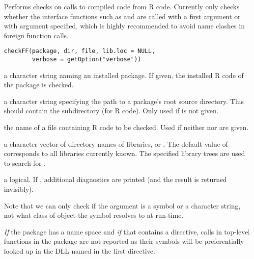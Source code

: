 %
\begin{Description}\relax
Performs checks on calls to compiled code from R code.  Currently only
checks whether the interface functions such as  and
 are called with a 
first argument or with argument  specified, which is
highly recommended to avoid name clashes in foreign function calls.
\end{Description}
%
\begin{Usage}
\begin{verbatim}
checkFF(package, dir, file, lib.loc = NULL,
        verbose = getOption("verbose"))
\end{verbatim}
\end{Usage}
%
\begin{Arguments}
\begin{ldescription}
\item[\code{package}] a character string naming an installed package.  If
given, the installed R code of the package is checked.
\item[\code{dir}] a character string specifying the path to a package's root
source directory.  This should contain the subdirectory 
(for R code).  Only used if  is not given.
\item[\code{file}] the name of a file containing R code to be checked.  Used
if neither  nor  are given.
\item[\code{lib.loc}] a character vector of directory names of \R{} libraries,
or .  The default value of  corresponds to all
libraries currently known.  The specified library trees are used to
search for .
\item[\code{verbose}] a logical.  If , additional diagnostics are
printed (and the result is returned invisibly).
\end{ldescription}
\end{Arguments}
%
\begin{Details}\relax
Note that we can only check if the  argument is a symbol or
a character string, not what class of object the symbol resolves to
at run-time.

\emph{If} the package has a name space and \emph{if} that contains a
 directive, calls in top-level functions in the
package are not reported as their symbols will be preferentially
looked up in the DLL named in the first  directive.
\end{Details}
